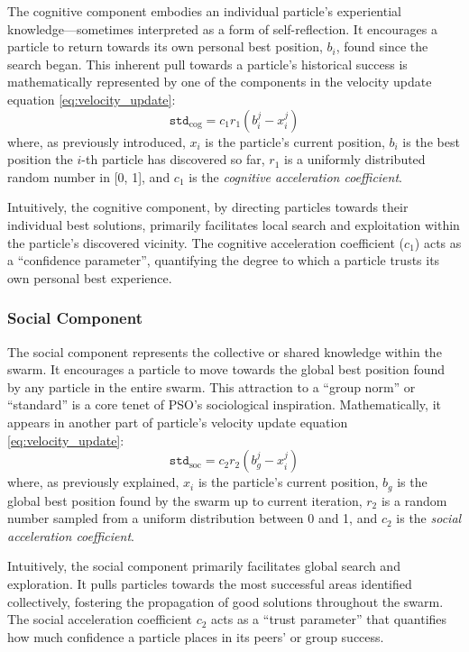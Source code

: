{The cognitive component embodies an individual particle's experiential knowledge---sometimes interpreted as a form of self-reflection. It encourages a particle to return towards its own personal best position, $b_i$, found since the search began. This inherent pull towards a particle's historical success is mathematically represented by one of the components in the velocity update equation \eqref{eq:velocity_update}:
\begin{equation}
\texttt{std}_\text{cog} = c_1 r_1 (b_{i}^{j} - x_{i}^{j})
\label{eq:std_cog_component}
\end{equation}
where, as previously introduced, $x_i$ is the particle's current position, $b_i$ is the best position the $i$-th particle has discovered so far, $r_1$ is a uniformly distributed random number in [0, 1], and $c_1$ is the \textit{cognitive acceleration coefficient}.

Intuitively, the cognitive component, by directing particles towards their individual best solutions, primarily facilitates local search and exploitation within the particle's discovered vicinity.
The cognitive acceleration coefficient ($c_1$) acts as a ``confidence parameter'', quantifying the degree to which a particle trusts its own personal best experience. 

\subsubsection{Social Component}

The social component represents the collective or shared knowledge within the swarm. It encourages a particle to move towards the global best position found by any particle in the entire swarm. This attraction to a ``group norm'' or ``standard'' is a core tenet of PSO's sociological inspiration. Mathematically, it appears in another part of particle's velocity update equation  \eqref{eq:velocity_update}:
\begin{equation}
\texttt{std}_\text{soc} = c_2 r_2 (b_{g}^{j} - x_{i}^{j})
\label{eq:std_soc_component}
\end{equation}
where, as previously explained, $x_i$ is the particle's current position, $b_g$ is the global best position found by the swarm up to current iteration, $r_2$ is a random number sampled from a uniform distribution between 0 and 1, and $c_2$ is the \textit{social acceleration coefficient}.

Intuitively, the social component primarily facilitates global search and exploration. It pulls particles towards the most successful areas identified collectively, fostering the propagation of good solutions throughout the swarm. The social acceleration coefficient $c_2$ acts as a ``trust parameter'' that quantifies how much confidence a particle places in its peers' or group success.

}
